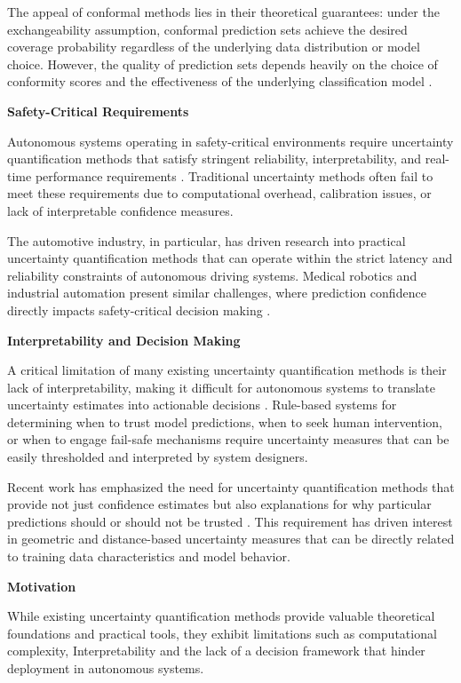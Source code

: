 The appeal of conformal methods lies in their theoretical guarantees: under the exchangeability assumption, conformal prediction sets achieve the desired coverage probability regardless of the underlying data distribution or model choice. However, the quality of prediction sets depends heavily on the choice of conformity scores and the effectiveness of the underlying classification model \cite{guha2024conformal}.

\textbf{Safety-Critical Requirements}

Autonomous systems operating in safety-critical environments require uncertainty quantification methods that satisfy stringent reliability, interpretability, and real-time performance requirements \cite{bigi2024prediction, wibbeke2025evaluating}. Traditional uncertainty methods often fail to meet these requirements due to computational overhead, calibration issues, or lack of interpretable confidence measures.

The automotive industry, in particular, has driven research into practical uncertainty quantification methods that can operate within the strict latency and reliability constraints of autonomous driving systems. Medical robotics and industrial automation present similar challenges, where prediction confidence directly impacts safety-critical decision making \cite{malinin2020regression}.

\textbf{Interpretability and Decision Making}

A critical limitation of many existing uncertainty quantification methods is their lack of interpretability, making it difficult for autonomous systems to translate uncertainty estimates into actionable decisions \cite{gawlikowski2021survey}. Rule-based systems for determining when to trust model predictions, when to seek human intervention, or when to engage fail-safe mechanisms require uncertainty measures that can be easily thresholded and interpreted by system designers.

Recent work has emphasized the need for uncertainty quantification methods that provide not just confidence estimates but also explanations for why particular predictions should or should not be trusted \cite{pintea2023step}. This requirement has driven interest in geometric and distance-based uncertainty measures that can be directly related to training data characteristics and model behavior.

\textbf{Motivation}

While existing uncertainty quantification methods provide valuable theoretical foundations and practical tools, they exhibit limitations such as computational complexity, Interpretability and the lack of a decision framework that hinder deployment in autonomous systems.

